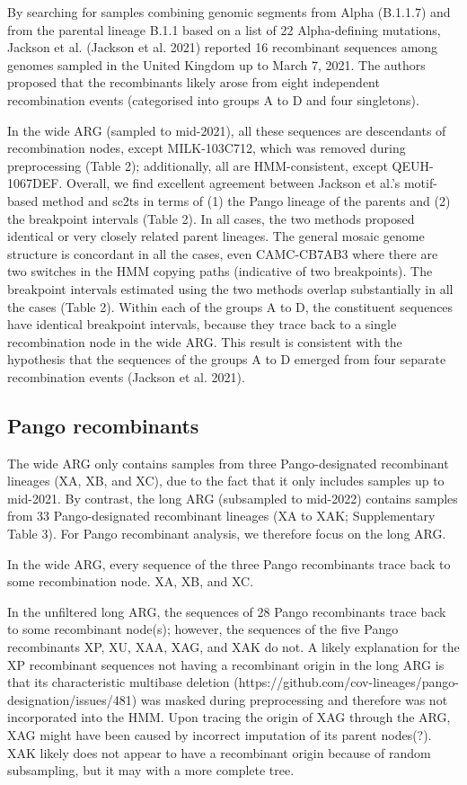 \documentclass{article}
\begin{document}
By searching for samples combining genomic segments from Alpha (B.1.1.7) and
from the parental lineage B.1.1 based on a list of 22 Alpha-defining mutations,
Jackson et al. (Jackson et al. 2021) reported 16 recombinant sequences among
genomes sampled in the United Kingdom up to March 7, 2021. The authors proposed
that the recombinants likely arose from eight independent recombination events
(categorised into groups A to D and four singletons).

In the wide ARG (sampled to mid-2021), all these sequences are descendants of
recombination nodes, except MILK-103C712, which was removed during
preprocessing (Table 2); additionally, all are HMM-consistent, except
QEUH-1067DEF. Overall, we find excellent agreement between Jackson et al.’s
motif-based method and sc2ts in terms of (1) the Pango lineage of the parents
and (2) the breakpoint intervals (Table 2). In all cases, the two methods
proposed identical or very closely related parent lineages. The general mosaic
genome structure is concordant in all the cases, even CAMC-CB7AB3 where there
are two switches in the HMM copying paths (indicative of two breakpoints). The
breakpoint intervals estimated using the two methods overlap substantially in
all the cases (Table 2). Within each of the groups A to D, the constituent
sequences have identical breakpoint intervals, because they trace back to a
single recombination node in the wide ARG. This result is consistent with the
hypothesis that the sequences of the groups A to D emerged from four separate
recombination events (Jackson et al. 2021).

\subsection{Pango recombinants}

The wide ARG only contains samples from three Pango-designated recombinant
lineages (XA, XB, and XC), due to the fact that it only includes samples up to
mid-2021. By contrast, the long ARG (subsampled to mid-2022) contains samples
from 33 Pango-designated recombinant lineages (XA to XAK; Supplementary Table
3). For Pango recombinant analysis, we therefore focus on the long ARG.

In the wide ARG, every sequence of the three Pango recombinants trace back to
some recombination node. XA, XB, and XC.

In the unfiltered long ARG, the sequences of 28 Pango recombinants trace back
to some recombinant node(s); however, the sequences of the five Pango
recombinants XP, XU, XAA, XAG, and XAK do not. A likely explanation for the XP
recombinant sequences not having a recombinant origin in the long ARG is that
its characteristic multibase deletion
(https://github.com/cov-lineages/pango-designation/issues/481) was masked
during preprocessing and therefore was not incorporated into the HMM. Upon
tracing the origin of XAG through the ARG, XAG might have been caused by
incorrect imputation of its parent nodes(?). XAK likely does not appear to have
a recombinant origin because of random subsampling, but it may with a more
complete tree.
\end{document}
